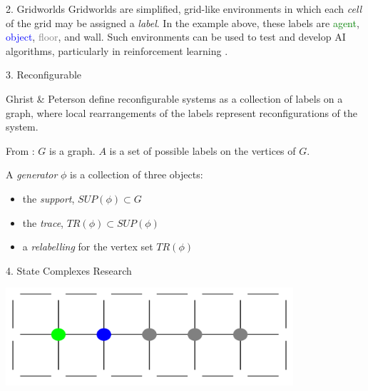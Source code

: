 \documentclass[
    a0paper, %
    landscape, %
    fontscale=0.3 %
    ]{baposter}
\begin{document}
\begin{poster}
\begin{posterbox}[
    name = grid,  %
    column = 0, %
    above=references,
    below=abstract
    ]{2. Gridworlds}
Gridworlds are simplified, grid-like environments in which each \textit{cell} of the grid may be assigned a \textit{label}. In the example above, these labels are \textcolor{green}{agent}, \textcolor{blue}{object}, \textcolor{gray}{floor}, and wall. Such environments can be used to test and develop AI algorithms, particularly in reinforcement learning \cite{Leike:2017}.
\end{posterbox}


\begin{posterbox}[
    name = reconfigsys,  %
    column = 1, %
    ]{3. Reconfigurable}
    
Ghrist \& Peterson \cite{Ghrist-Peterson:2007} define reconfigurable systems as a collection of labels on a graph, where local rearrangements of the labels represent reconfigurations of the system.
\vspace{0.15cm}

From \cite{Ghrist-Peterson:2007}: $G$ is a graph. $A$ is a set of possible labels on the vertices of $G$.
\vspace{0.15cm}

A \textit{generator} $\phi$ is a collection of three objects:
\begin{itemize}
    \item the \textit{support}, $SUP(\phi) \subset G$
    \item the \textit{trace}, $TR(\phi) \subset SUP(\phi)$
    \item a \textit{relabelling} for the vertex set $TR(\phi)$
\end{itemize}
\end{posterbox}


\begin{posterbox}[
    name = scs,  %
    column = 1, %
    aligned=references,
    below=reconfigsys,
    above=futureresearch
    ]{4. State Complexes Research}
    
\begin{center}
\includegraphics[width=0.8\textwidth]{coorridor.PNG}
\vspace{0.15cm}


\end{center}
\end{posterbox}
\end{poster}
\end{document}
